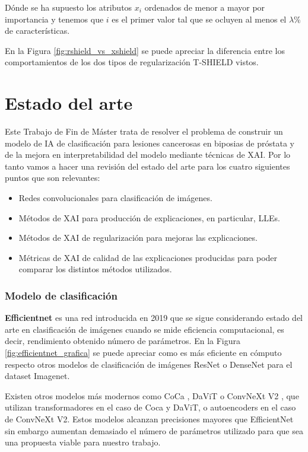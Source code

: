 Dónde se ha supuesto los atributos $x_i$ ordenados de menor a mayor por importancia y tenemos que $i$ es el primer valor tal que se ocluyen al menos el $\lambda \%$ de características.



En la Figura \ref{fig:rshield_vs_xshield} se puede apreciar la diferencia entre los comportamientos de los dos tipos de regularización T-SHIELD vistos.




\newpage
\chapter{Estado del arte} \label{cap:eda}
Este Trabajo de Fin de Máster trata de resolver el problema de construir un modelo de IA de clasificación para lesiones cancerosas en biposias de próstata y de la mejora en interpretabilidad del modelo mediante técnicas de XAI. Por lo tanto vamos a hacer una revisión del estado del arte para los cuatro siguientes puntos que son relevantes:


\begin{itemize}
\item Redes convolucionales para clasificación de imágenes.
\item Métodos de XAI para producción de explicaciones, en particular, LLEs.
\item Métodos de XAI de regularización para mejoras las explicaciones.
\item Métricas de XAI de calidad de las explicaciones producidas para poder comparar los distintos métodos utilizados.
\end{itemize}

\subsection*{Modelo de clasificación}

\textbf{Efficientnet} \cite{efficientnet2019} es una red introducida en 2019 que se sigue considerando estado del arte en clasificación de imágenes cuando se mide eficiencia computacional, es decir, rendimiento obtenido número de parámetros. En la Figura \ref{fig:efficientnet_grafica} se puede apreciar como es más eficiente en cómputo respecto otros modelos de clasificación de imágenes ResNet \cite{resnet} o DenseNet \cite{densenet} para el dataset Imagenet. 

Existen otros modelos más modernos como CoCa \cite{coca}, DaViT \cite{DaViT} o ConvNeXt V2 \cite{ConvNext}, que utilizan transformadores en el caso de Coca y DaViT, o autoencoders en el caso de ConvNeXt V2. Estos modelos alcanzan precisiones mayores que EfficientNet sin embargo aumentan demasiado el número de parámetros utilizado para que sea una propuesta viable para nuestro trabajo.

